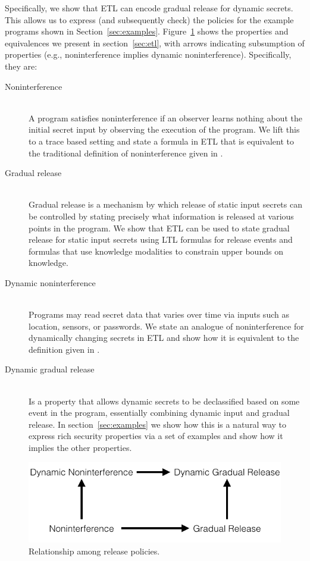 \documentclass[conference]{IEEEtran}
\theoremstyle{definition}
\newcommand{\comment}[3][\color{red}]{{#1{[{#2}: {#3}]}}}
\newcommand{\kris}[1]{\comment[\color{orange}]{kris}{#1}}
\begin{document}
Specifically, we show that ETL can encode gradual release for dynamic
secrets.  This allows us to express (and subsequently check) the
policies for the example programs shown in Section~\ref{sec:examples}.
Figure~\ref{fig:ni-implication} shows the properties and equivalences
we present in section~\ref{sec:etl}, with arrows indicating
subsumption of properties (e.g., noninterference implies dynamic
noninterference).  Specifically, they are:

\begin{description}
\item[Noninterference] \hfill \\
  A program satisfies noninterference if an observer learns nothing
  about the initial secret input by observing the execution of the
  program.  We lift this to a trace based setting and state a formula
  in ETL that is equivalent to the traditional definition of
  noninterference given in \kris{cite}.
\item[Gradual release] \hfill \\
  Gradual release is a mechanism by which release of static input
  secrets can be controlled by stating precisely what information is
  released at various points in the program.  We show that ETL can be
  used to state gradual release for static input secrets using LTL
  formulas for release events and formulas that use knowledge
  modalities to constrain upper bounds on knowledge.
\item[Dynamic noninterference] \hfill \\
  Programs may read secret data that varies over time via inputs such
  as location, sensors, or passwords.  We state an analogue of
  noninterference for dynamically changing secrets in ETL and show how
  it is equivalent to the definition given in \cite{O'Neill:06}
  \kris{wrong cite I think we want 08}.
\item[Dynamic gradual release] \hfill \\
  Is a property that allows dynamic secrets to be declassified
  based on some event in the program, essentially combining dynamic
  input and gradual release.  In section~\ref{sec:examples} we show
  how this is a natural way to express rich security properties via a
  set of examples and show how it implies the other properties.
\end{description}

\begin{figure}
\includegraphics[width=\linewidth]{ni-implication}
\caption{Relationship among release policies.}
\label{fig:ni-implication}
\end{figure}
\end{document}
